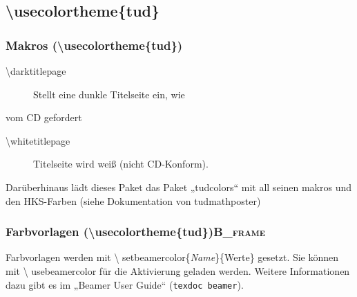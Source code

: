 \documentclass[presentation,t]{beamer}
\begin{document}
\subsection{\textbackslash usecolortheme\{tud\}}
\label{sec:org61002fd}

\subsubsection{Makros (\textbackslash usecolortheme\{tud\})}
\label{sec:org84d4b34}
\begin{description}
\item[{\textbackslash darktitlepage}] Stellt eine dunkle Titelseite ein, wie
\end{description}
vom CD gefordert
\begin{description}
\item[{\textbackslash whitetitlepage}] Titelseite wird weiß (nicht CD-Konform).
\end{description}

Darüberhinaus lädt dieses Paket das Paket „tudcolors“ mit all seinen
makros und den HKS-Farben (siehe Dokumentation von tudmathposter)

\subsubsection[Farbvorlagen (\textbackslash usecolortheme\{tud\})]{Farbvorlagen (\textbackslash usecolortheme\{tud\})\hfill{}\textsc{B\_frame}}
\label{sec:org7406959}
Farbvorlagen werden mit \textbackslash
setbeamercolor\{\emph{Name}\}\{Werte\} gesetzt. Sie können mit \textbackslash
usebeamercolor für die Aktivierung geladen werden. Weitere Informationen dazu gibt es im
„Beamer User Guide“ (\texttt{texdoc beamer}).
\end{document}
